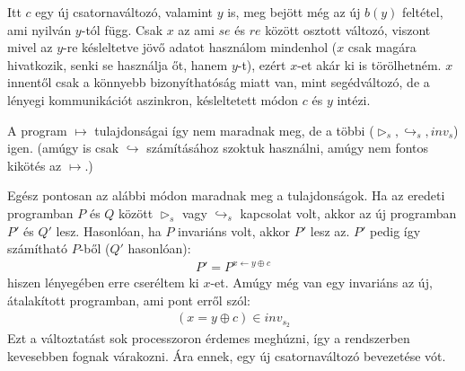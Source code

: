 \documentclass{article}
\begin{document}
Itt $c$ egy új csatornaváltozó, valamint $y$ is, meg bejött még az új $b(y)$ feltétel, ami nyilván $y$-tól függ. Csak $x$ az ami $se $ és $re$ között osztott változó, viszont mivel az $y$-re késleltetve jövő adatot használom mindenhol ($x$ csak magára hivatkozik, senki
se használja őt, hanem $y$-t), ezért $x$-et akár ki is törölhetném. $x$ innentől csak a könnyebb bizonyíthatóság miatt van, mint segédváltozó, de a lényegi kommunikációt aszinkron, késleltetett módon $c$ és $y$ intézi.

A program $\mapsto$ tulajdonságai így nem maradnak meg, de a többi ($\triangleright_s, \hookrightarrow_s,inv_s$) igen. (amúgy is csak $\hookrightarrow$ számításához szoktuk használni, amúgy nem fontos kikötés az $\mapsto$.)

Egész pontosan az alábbi módon maradnak meg a tulajdonságok. Ha az eredeti programban $P$ és $Q$ között $\triangleright_s$ vagy $\hookrightarrow_s$ kapcsolat volt, akkor az új programban $P'$ és $Q'$ lesz. Hasonlóan, ha $P$ invariáns volt, akkor $P'$ lesz az. $P'$ pedig így számítható $P$-ből ($Q'$ hasonlóan):
\begin{align*}
P' = P^{x\leftarrow y\oplus c}
\end{align*}
hiszen lényegében erre cseréltem ki $x$-et.
Amúgy még van egy invariáns az új, átalakított programban, ami pont erről szól:
\begin{align*}
(x=y\oplus c)\in inv_{s_2}
\end{align*}
Ezt a változtatást sok processzoron érdemes meghúzni, így a rendszerben kevesebben fognak várakozni. Ára ennek, egy új csatornaváltozó bevezetése vót.
\end{document}
